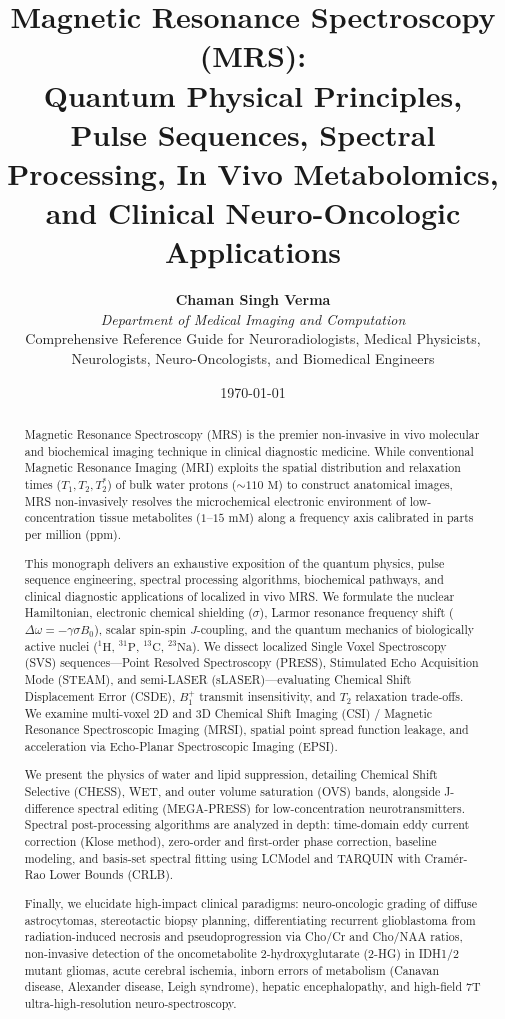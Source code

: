 \documentclass[11pt,a4paper]{article}
\title{\textbf{\huge Magnetic Resonance Spectroscopy (MRS):}\\[0.4em]
\Large Quantum Physical Principles, Pulse Sequences, Spectral Processing, In Vivo Metabolomics, and Clinical Neuro-Oncologic Applications}
\author{\textbf{Chaman Singh Verma} \\
\textit{Department of Medical Imaging and Computation} \\
\small \textsf{Comprehensive Reference Guide for Neuroradiologists, Medical Physicists,}\\[0.2em]
\small \textsf{Neurologists, Neuro-Oncologists, and Biomedical Engineers}}
\date{\today}
\begin{document}
\maketitle

\begin{abstract}
Magnetic Resonance Spectroscopy (MRS) is the premier non-invasive in vivo molecular and biochemical imaging technique in clinical diagnostic medicine. While conventional Magnetic Resonance Imaging (MRI) exploits the spatial distribution and relaxation times ($T_1, T_2, T_2^*$) of bulk water protons ($\sim 110\text{ M}$) to construct anatomical images, MRS non-invasively resolves the microchemical electronic environment of low-concentration tissue metabolites ($1\text{--}15\text{ mM}$) along a frequency axis calibrated in parts per million (ppm).

This monograph delivers an exhaustive exposition of the quantum physics, pulse sequence engineering, spectral processing algorithms, biochemical pathways, and clinical diagnostic applications of localized in vivo MRS. We formulate the nuclear Hamiltonian, electronic chemical shielding ($\sigma$), Larmor resonance frequency shift ($\Delta \omega = -\gamma \sigma B_0$), scalar spin-spin $J$-coupling, and the quantum mechanics of biologically active nuclei ($^1\text{H}$, $^{31}\text{P}$, $^{13}\text{C}$, $^{23}\text{Na}$). We dissect localized Single Voxel Spectroscopy (SVS) sequences---Point Resolved Spectroscopy (PRESS), Stimulated Echo Acquisition Mode (STEAM), and semi-LASER (sLASER)---evaluating Chemical Shift Displacement Error (CSDE), $B_1^+$ transmit insensitivity, and $T_2$ relaxation trade-offs. We examine multi-voxel 2D and 3D Chemical Shift Imaging (CSI) / Magnetic Resonance Spectroscopic Imaging (MRSI), spatial point spread function leakage, and acceleration via Echo-Planar Spectroscopic Imaging (EPSI).

We present the physics of water and lipid suppression, detailing Chemical Shift Selective (CHESS), WET, and outer volume saturation (OVS) bands, alongside J-difference spectral editing (MEGA-PRESS) for low-concentration neurotransmitters. Spectral post-processing algorithms are analyzed in depth: time-domain eddy current correction (Klose method), zero-order and first-order phase correction, baseline modeling, and basis-set spectral fitting using LCModel and TARQUIN with Cramér-Rao Lower Bounds (CRLB). 

Finally, we elucidate high-impact clinical paradigms: neuro-oncologic grading of diffuse astrocytomas, stereotactic biopsy planning, differentiating recurrent glioblastoma from radiation-induced necrosis and pseudoprogression via Cho/Cr and Cho/NAA ratios, non-invasive detection of the oncometabolite 2-hydroxyglutarate (2-HG) in IDH1/2 mutant gliomas, acute cerebral ischemia, inborn errors of metabolism (Canavan disease, Alexander disease, Leigh syndrome), hepatic encephalopathy, and high-field 7T ultra-high-resolution neuro-spectroscopy.
\end{abstract}
\end{document}
